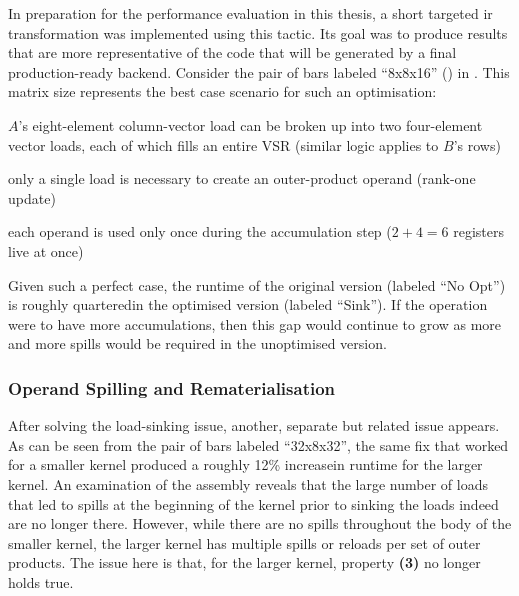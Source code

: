 \documentclass[\main/thesis.tex]{subfiles}
\begin{document}
In preparation for the performance evaluation in this thesis, a short targeted \gls{ir} transformation was implemented using this tactic.
Its goal was to produce results that are more representative of the code that will be generated by a final production-ready backend.
Consider the pair of bars labeled ``8x8x16'' () in .
This matrix size represents the best case scenario for such an optimisation:
\begin{enumerate*}[itemjoin={{; }}, itemjoin*={{; and }}, label=\textbf{(\arabic*)}, after={.}]
  \item $A$'s eight-element column-vector load can be broken up into two four-element vector loads, each of which fills an entire VSR (similar logic applies to $B$'s rows)
  \item only a single load is necessary to create an outer-product operand (rank-one update)
  \item each operand is used only once during the accumulation step ($2+4=6$ registers \gls{live} at once)
\end{enumerate*}
Given such a perfect case, the runtime of the original version (labeled ``No Opt'') is roughly quartered\footnotemark in the optimised version (labeled ``Sink'').
If the operation were to have more accumulations, then this gap would continue to grow as more and more spills would be required in the unoptimised version.

\subsubsection{Operand Spilling and Rematerialisation}
After solving the load-sinking issue, another, separate but related issue appears.
As can be seen from the pair of bars labeled ``32x8x32'', the same fix that worked for a smaller kernel produced a roughly 12\% increase\footnotemark in runtime for the larger kernel.
An examination of the assembly reveals that the large number of loads that led to spills at the beginning of the kernel prior to sinking the loads indeed are no longer there.
However, while there are no spills throughout the body of the smaller kernel, the larger kernel has multiple spills or reloads per set of outer products.
The issue here is that, for the larger kernel, property \textbf{(3)} no longer holds true.
\end{document}
